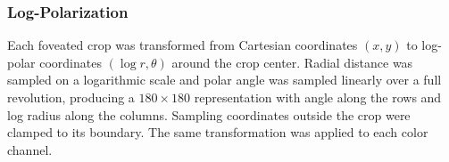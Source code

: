 \subsubsection{Log-Polarization}
Each foveated crop was transformed from Cartesian coordinates $(x,y)$ to log-polar coordinates $(\log r,\theta)$ around the crop center. Radial distance was sampled on a logarithmic scale and polar angle was sampled linearly over a full revolution, producing a $180\times180$ representation with angle along the rows and log radius along the columns. Sampling coordinates outside the crop were clamped to its boundary. The same transformation was applied to each color channel.
